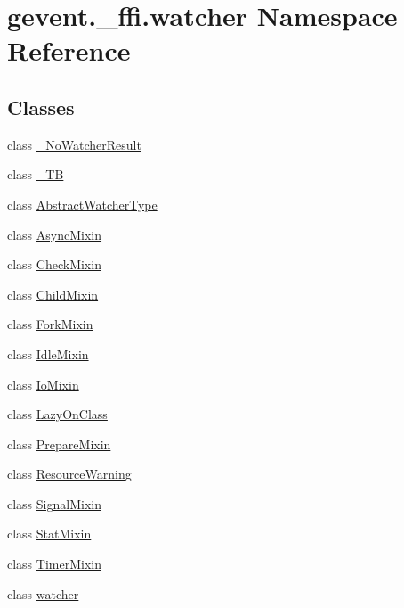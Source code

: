 \hypertarget{namespacegevent_1_1__ffi_1_1watcher}{}\section{gevent.\+\_\+ffi.\+watcher Namespace Reference}
\label{namespacegevent_1_1__ffi_1_1watcher}
\subsection*{Classes}
\begin{DoxyCompactItemize}
\item 
class \hyperlink{classgevent_1_1__ffi_1_1watcher_1_1___no_watcher_result}{\+\_\+\+No\+Watcher\+Result}
\item 
class \hyperlink{classgevent_1_1__ffi_1_1watcher_1_1___t_b}{\+\_\+\+TB}
\item 
class \hyperlink{classgevent_1_1__ffi_1_1watcher_1_1_abstract_watcher_type}{Abstract\+Watcher\+Type}
\item 
class \hyperlink{classgevent_1_1__ffi_1_1watcher_1_1_async_mixin}{Async\+Mixin}
\item 
class \hyperlink{classgevent_1_1__ffi_1_1watcher_1_1_check_mixin}{Check\+Mixin}
\item 
class \hyperlink{classgevent_1_1__ffi_1_1watcher_1_1_child_mixin}{Child\+Mixin}
\item 
class \hyperlink{classgevent_1_1__ffi_1_1watcher_1_1_fork_mixin}{Fork\+Mixin}
\item 
class \hyperlink{classgevent_1_1__ffi_1_1watcher_1_1_idle_mixin}{Idle\+Mixin}
\item 
class \hyperlink{classgevent_1_1__ffi_1_1watcher_1_1_io_mixin}{Io\+Mixin}
\item 
class \hyperlink{classgevent_1_1__ffi_1_1watcher_1_1_lazy_on_class}{Lazy\+On\+Class}
\item 
class \hyperlink{classgevent_1_1__ffi_1_1watcher_1_1_prepare_mixin}{Prepare\+Mixin}
\item 
class \hyperlink{classgevent_1_1__ffi_1_1watcher_1_1_resource_warning}{Resource\+Warning}
\item 
class \hyperlink{classgevent_1_1__ffi_1_1watcher_1_1_signal_mixin}{Signal\+Mixin}
\item 
class \hyperlink{classgevent_1_1__ffi_1_1watcher_1_1_stat_mixin}{Stat\+Mixin}
\item 
class \hyperlink{classgevent_1_1__ffi_1_1watcher_1_1_timer_mixin}{Timer\+Mixin}
\item 
class \hyperlink{classgevent_1_1__ffi_1_1watcher_1_1watcher}{watcher}
\end{DoxyCompactItemize}
